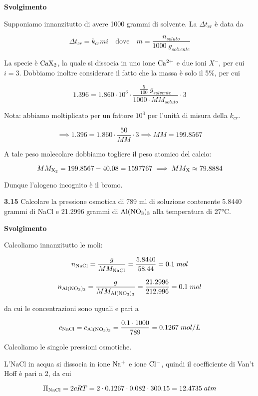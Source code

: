 \vspace{0.2cm}\large\textbf{Svolgimento}\normalsize

\vspace{0.2cm}Supponiamo innanzitutto di avere 1000 grammi di solvente. La $\Delta t_{cr}$ è data da

$$\Delta t_{cr}=k_{cr} m i
\quad\text{dove}\quad
m=\frac{n_{soluto}}{1000\;g_{solvente}}$$

La specie è $\rm CaX_2$, la quale si dissocia in uno ione $\rm Ca^{2+}$ e due ioni $X^-$, per cui $i=3$. Dobbiamo inoltre considerare il fatto che la massa è solo il 5\%, per cui

$$1.396=1.860 \cdot 10^3 \cdot \frac{\displaystyle \frac{5}{100}\;g_{solvente}}{1000 \cdot MM_{soluto}} \cdot 3$$

Nota: abbiamo moltiplicato per un fattore $10^3$ per l'unità di misura della $k_{cr}$.

$$\implies
1.396=1.860 \cdot \frac{50}{MM} \cdot 3
\implies
MM=199.8567$$

A tale peso molecolare dobbiamo togliere il peso atomico del calcio:

$$MM_{\rm X_2}=199.8567-40.08=1597767
\implies
MM_{\rm X} \approx 79.8884$$

Dunque l'alogeno incognito è il bromo.

\vspace{0.2cm}\textbf{3.15} Calcolare la pressione osmotica di 789 ml di soluzione contenente 5.8440 grammi di NaCl e  21.2996 grammi di $\rm Al(NO_3)_3$ alla temperatura di 27°C.

\vspace{0.2cm}\large\textbf{Svolgimento}\normalsize

\vspace{0.2cm}Calcoliamo innanzitutto le moli:

$$n_{\rm NaCl}=\frac{g}{MM_{\rm NaCl}}
=\frac{5.8440}{58.44}=0.1\;mol$$

$$n_{\rm Al(NO_3)_3}=\frac{g}{MM_{\rm Al(NO_3)_3}}
=\frac{21.2996}{212.996}=0.1\;mol$$

da cui le concentrazioni sono uguali e pari a

$$c_{\rm NaCl}=c_{\rm Al(NO_3)_3}=\frac{0.1 \cdot 1000}{789}
=0.1267\;mol/L$$

Calcoliamo le singole pressioni osmotiche.

L'NaCl in acqua si dissocia in ione $\rm Na^+$ e ione $\rm Cl^-$, quindi il coefficiente di Van't Hoff è pari a 2, da cui

$$\Pi_{\rm NaCl}=2cRT=2 \cdot 0.1267 \cdot 0.082 \cdot 300.15=12.4735\;atm$$

